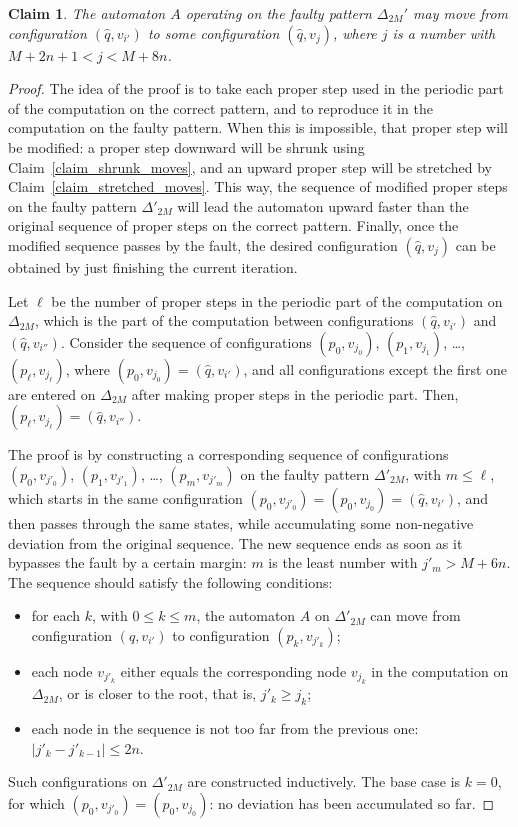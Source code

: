 \documentclass[12pt,a4paper]{article}
\newtheorem{claim}{Claim}
\theoremstyle{definition}
\begin{document}
\begin{claim}\label{claim_passing_by_v_M_v_M_plus_1}
The automaton $A$ operating on the faulty pattern $\Delta_{2M}'$
may move from configuration $(\widehat{q},v_{i'})$
to some configuration $(\widehat{q}, v_j)$,
where $j$ is a number with $M+2n+1 < j < M+8n$.
\end{claim}
\begin{proof}
The idea of the proof is to take each proper step
used in the periodic part of the computation on the correct pattern,
and to reproduce it in the computation on the faulty pattern.
When this is impossible, that proper step will be modified:
a proper step downward will be shrunk using Claim~\ref{claim_shrunk_moves},
and an upward proper step will be stretched by Claim~\ref{claim_stretched_moves}.
This way, the sequence of modified proper steps on the faulty pattern $\Delta'_{2M}$
will lead the automaton upward faster than
the original sequence of proper steps on the correct pattern. 
Finally, once the modified sequence passes by the fault,
the desired configuration $(\widehat{q}, v_j)$
can be obtained by just finishing the current iteration.

Let $\ell$ be the number of proper steps in the periodic part of the computation on $\Delta_{2M}$, 
which is the part of the computation between configurations
$(\widehat{q},v_{i'})$ and $(\widehat{q},v_{i''})$.
Consider the sequence of configurations 
$(p_0,v_{j_0})$, $(p_1,v_{j_1})$, \ldots, $(p_\ell,v_{j_\ell})$,
where $(p_0,v_{j_0}) = (\widehat{q}, v_{i'})$,
and all configurations except the first one
are entered on $\Delta_{2M}$ after making proper steps in the periodic part. 
Then, $(p_\ell,v_{j_\ell}) = (\widehat{q}, v_{i''})$.

The proof is by constructing a corresponding sequence of configurations
$(p_0,v_{j'_0})$, $(p_1,v_{j'_1})$, \ldots, $(p_m, v_{j'_m})$
on the faulty pattern $\Delta'_{2M}$, with $m \leqslant \ell$,
which starts in the same configuration $(p_0,v_{j'_0}) = (p_0,v_{j_0}) = (\widehat{q}, v_{i'})$,
and then passes through the same states,
while accumulating some non-negative deviation from the original sequence.
The new sequence ends as soon as it bypasses the fault
by a certain margin: $m$ is the least number with $j'_m > M+6n$.
The sequence should satisfy the following conditions:
\begin{itemize}
\item
	for each $k$, with $0 \leqslant k \leqslant m$,
	the automaton $A$ on $\Delta'_{2M}$
	can move from configuration $(\widehat{q}, v_{i'})$
	to configuration $(p_k,v_{j'_k})$;
\item
	each node $v_{j'_k}$ either equals the corresponding node $v_{j_k}$
	in the computation on $\Delta_{2M}$,
	or is closer to the root,
	that is, $j'_k \geqslant j_k$;
\item
	each node in the sequence is not too far from the previous one:
	$|j'_k - j'_{k-1}| \leqslant 2n$.
\end{itemize}
Such configurations on $\Delta'_{2M}$ are constructed inductively.
The base case is $k=0$, for which $(p_0,v_{j'_0}) = (p_0,v_{j_0})$:
no deviation has been accumulated so far.


\end{proof}
\end{document}
